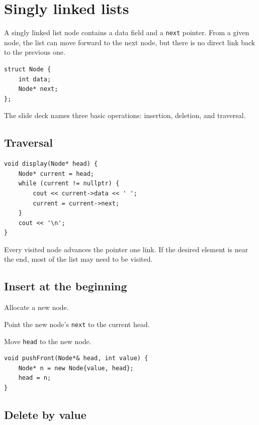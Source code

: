 \section{Singly linked lists}

A singly linked list node contains a data field and a \texttt{next} pointer. From a given node, the list can move forward to the next node, but there is no direct link back to the previous one.

\begin{lstlisting}
struct Node {
    int data;
    Node* next;
};
\end{lstlisting}

The slide deck names three basic operations: insertion, deletion, and traversal.

\subsection{Traversal}

\begin{lstlisting}
void display(Node* head) {
    Node* current = head;
    while (current != nullptr) {
        cout << current->data << ' ';
        current = current->next;
    }
    cout << '\n';
}
\end{lstlisting}

Every visited node advances the pointer one link. If the desired element is near the end, most of the list may need to be visited.

\subsection{Insert at the beginning}

\begin{mlsteps}
  \item Allocate a new node.
  \item Point the new node's \texttt{next} to the current head.
  \item Move \texttt{head} to the new node.
\end{mlsteps}

\begin{lstlisting}
void pushFront(Node*& head, int value) {
    Node* n = new Node{value, head};
    head = n;
}
\end{lstlisting}

\subsection{Delete by value}

